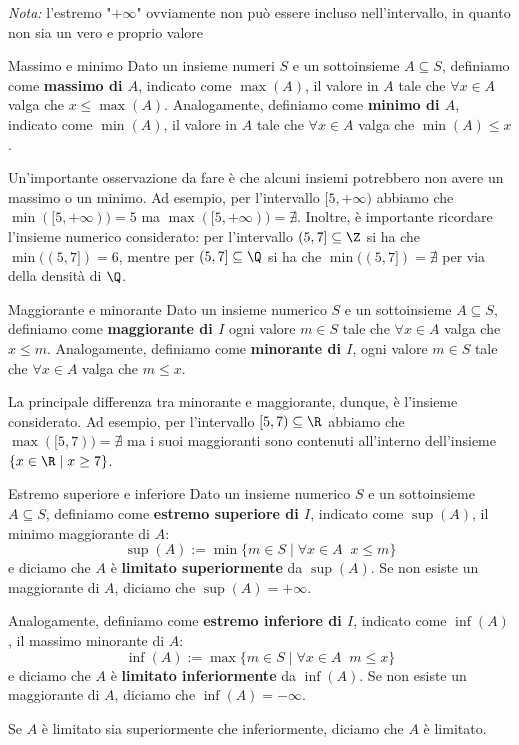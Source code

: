 \documentclass[a4paper, 12pt]{report}
\begin{document}
    \textit{Nota:} l'estremo "$+\infty$" ovviamente non può essere incluso nell'intervallo, in quanto non sia un vero e proprio valore

    \begin{frameddefn}{Massimo e minimo}
        Dato un insieme numeri $S$ e un sottoinsieme $A \subseteq S$, definiamo come \textbf{massimo di $A$}, indicato come $\max(A)$, il valore in $A$ tale che $\forall x \in A$ valga che $x \leq \max(A)$. Analogamente, definiamo come \textbf{minimo di $A$}, indicato come $\min(A)$, il valore in $A$ tale che $\forall x \in A$ valga che $\min(A) \leq x$.
    \end{frameddefn}

    Un'importante osservazione da fare è che alcuni insiemi potrebbero non avere un massimo o un minimo. Ad esempio, per l'intervallo $[5, +\infty)$ abbiamo che $\min([5,+\infty)) = 5$ ma $\max([5,+\infty)) = \nexists$. Inoltre, è importante ricordare l'insieme numerico considerato: per l'intervallo $(5,7] \subseteq \Z$ si ha che $\min((5,7]) = 6$, mentre per $(5,7] \subseteq \Q$ si ha che $\min((5,7]) = \nexists$ per via della densità di $\Q$.

    \begin{frameddefn}{Maggiorante e minorante}
        Dato un insieme numerico $S$ e un sottoinsieme $A \subseteq S$, definiamo come \textbf{maggiorante di $I$} ogni valore $m \in S$ tale che $\forall x \in A$ valga che $x \leq m$. Analogamente,  definiamo come \textbf{minorante di $I$}, ogni valore $m \in S$ tale che $\forall x \in A$ valga che $m \leq x$.
    \end{frameddefn}

    La principale differenza tra minorante e maggiorante, dunque, è l'insieme considerato. Ad esempio, per l'intervallo $[5,7) \subseteq \R$ abbiamo che $\max([5,7)) = \nexists$ ma i suoi maggioranti sono contenuti all'interno dell'insieme $\{x \in \R \mid x \geq 7\}$.

    \begin{frameddefn}{Estremo superiore e inferiore}
        Dato un insieme numerico $S$ e un sottoinsieme $A \subseteq S$, definiamo come \textbf{estremo superiore di $I$}, indicato come $\sup(A)$, il minimo maggiorante di $A$:
        \[\sup(A) := \min \{ m \in S \mid \forall x \in A \;\; x \leq m\}\]
        e diciamo che $A$ è \textbf{limitato superiormente} da $\sup(A)$. Se non esiste un maggiorante di $A$, diciamo che $\sup(A) = +\infty$.

        Analogamente, definiamo come \textbf{estremo inferiore di $I$}, indicato come $\inf(A)$, il massimo minorante di $A$:
        \[\inf(A) := \max \{ m \in S \mid \forall x \in A \;\; m \leq x\}\]
        e diciamo che $A$ è \textbf{limitato inferiormente} da $\inf(A)$. Se non esiste un maggiorante di $A$, diciamo che $\inf(A) = -\infty$.

        Se $A$ è limitato sia superiormente che inferiormente, diciamo che $A$ è limitato.
    \end{frameddefn}
\end{document}
